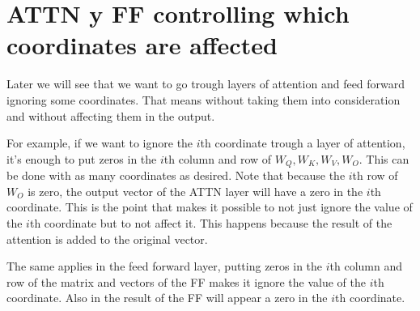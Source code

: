 \section*{ATTN y FF controlling which coordinates are affected}
Later we will see that we want to go trough layers of attention and feed forward ignoring some coordinates. That means without taking them into consideration and without affecting them in the output.

For example, if we want to ignore the $i$th coordinate trough a layer of attention, it's enough to put zeros in the $i$th column and row of $W_Q, W_K, W_V, W_O$. This can be done with as many coordinates as desired. Note that because the $i$th row of $W_O$ is zero, the output vector of the ATTN layer will have a zero in the $i$th coordinate. This is the point that makes it possible to not just ignore the value of the $i$th coordinate but to not affect it. This happens because the result of the attention is added to the original vector.

The same applies in the feed forward layer, putting zeros in the $i$th column and row of the matrix and vectors of the FF makes it ignore the value of the $i$th coordinate. Also in the result of the FF will appear a zero in the $i$th coordinate.
